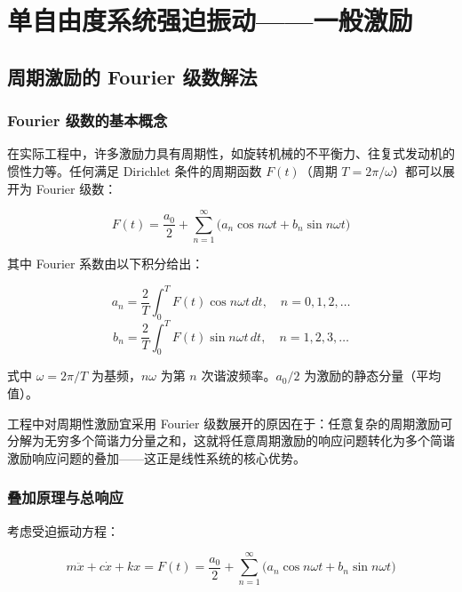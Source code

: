 \chapter{单自由度系统强迫振动——一般激励}

\section{周期激励的 Fourier 级数解法}

\subsection{Fourier 级数的基本概念}

在实际工程中，许多激励力具有周期性，如旋转机械的不平衡力、往复式发动机的惯性力等。任何满足 Dirichlet 条件的周期函数 $F(t)$（周期 $T = 2\pi/\omega$）都可以展开为 Fourier 级数：

\begin{myformula}
\[
F(t) = \frac{a_0}{2} + \sum_{n=1}^{\infty} \bigl( a_n \cos n\omega t + b_n \sin n\omega t \bigr)
\]
\end{myformula}

其中 Fourier 系数由以下积分给出：

\begin{myformula}
\[
a_n = \frac{2}{T}\int_{0}^{T} F(t) \cos n\omega t \,dt,\quad n=0,1,2,\ldots
\]
\[
b_n = \frac{2}{T}\int_{0}^{T} F(t) \sin n\omega t \,dt,\quad n=1,2,3,\ldots
\]
\end{myformula}

式中 $\omega = 2\pi/T$ 为基频，$n\omega$ 为第 $n$ 次谐波频率。$a_0/2$ 为激励的静态分量（平均值）。

工程中对周期性激励宜采用 Fourier 级数展开的原因在于：任意复杂的周期激励可分解为无穷多个简谐力分量之和，这就将任意周期激励的响应问题转化为多个简谐激励响应问题的叠加——这正是线性系统的核心优势。

\subsection{叠加原理与总响应}

考虑受迫振动方程：

\begin{myformula}
\[
m\ddot{x} + c\dot{x} + kx = F(t) = \frac{a_0}{2} + \sum_{n=1}^{\infty} \bigl( a_n \cos n\omega t + b_n \sin n\omega t \bigr)
\]
\end{myformula}


